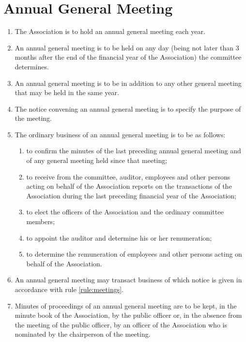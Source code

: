 \section{Annual General Meeting}
\label{rule:agm}

\begin{enumerate}
	\item The Association is to hold an annual general meeting each year.
	\item An annual general meeting is to be held on any day (being not later than 3 months after the end of the financial year of the Association) the committee determines.
	\item An annual general meeting is to be in addition to any other general meeting that may be held in the same year.
	\item The notice convening an annual general meeting is to specify the purpose of the meeting.
	
	\item \label{subrule:agm:ordinaryBusiness} The ordinary business of an annual general meeting is to be as follows:
	\begin{enumerate}
		\item to confirm the minutes of the last preceding annual general meeting and of any general meeting held since that meeting;
		\item \label{subsubrule:agm:ordinaryBusiness:reports} to receive from the committee, auditor, employees and other persons acting on behalf of the Association reports on the transactions of the Association during the last preceding financial year of the Association;
		\item to elect the officers of the Association and the ordinary committee members;
		\item \label{subsubrule:agm:ordinaryBusiness:auditor} to appoint the auditor and determine his or her remuneration;
		\item to determine the remuneration of employees and other persons acting on behalf of the Association.
	\end{enumerate}
	
	\item An annual general meeting may transact business of which notice is given in accordance with rule \ref{rule:meetings}.
	\item Minutes of proceedings of an annual general meeting are to be kept, in the minute book of the Association, by the public officer or, in the absence from the meeting of the public officer, by an officer of the Association who is nominated by the chairperson of the meeting.
\end{enumerate}